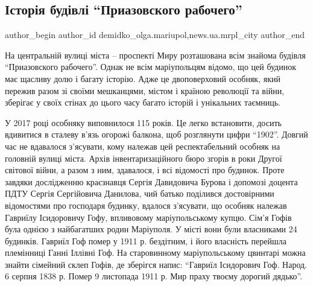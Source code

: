  
 
 
 
 
 
\subsection{Історія будівлі \enquote{Приазовского рабочего}}
\label{sec:07_12_2017.stz.news.ua.mrpl_city.1.istoria_budivli_priazovskogo_rabochego}
 
\ifcmt
 author_begin
   author_id demidko_olga.mariupol,news.ua.mrpl_city
 author_end
\fi


На центральній вулиці міста – проспекті Миру розташована всім знайома будівля
\enquote{Приазовского рабочего}. Однак не всім маріупольцям відомо, що цей будинок має
щасливу долю і багату історію. Адже це двоповерховий особняк, який пережив
разом зі своїми мешканцями, містом і країною революції та війни, зберігає у
своїх стінах до цього часу багато історій і унікальних таємниць. 


У 2017 році особняку виповнилося 115 років. Це легко встановити, досить
вдивитися в сталеву в'язь огорожі балкона, щоб розглянути цифри \enquote{1902}. Довгий
час не вдавалося з'ясувати, кому належав цей респектабельний особняк на
головній вулиці міста. Архів інвентаризаційного бюро згорів в роки Другої
світової війни, а разом з ним, здавалося, і всі відомості про будинок. Проте
завдяки дослідженню краєзнавця Сергія Давидовича Бурова і допомозі доцента
ПДТУ Сергія Сергійовича Данилова, чий батько поділився достовірними
відомостями про господаря будинку, вдалося з'ясувати, що особняк належав
Гавриїлу Ісидоровичу Гофу, впливовому маріупольському купцю. Сім'я Гофів була
однією з найбагатших родин Маріуполя. У місті вони були власниками 24
будинків. Гавриїл Гоф помер у 1911 р. бездітним, і його власність перейшла
племінниці Ганні Іллівні Гоф. На старовинному маріупольському цвинтарі можна
знайти сімейний склеп Гофів, де зберігся напис: \enquote{Гавриїл Ісидорович Гоф.
Народ. 6 серпня 1838 р. Помер 9 листопада 1911 р. Мир праху твоєму дорогий
дядько}.

